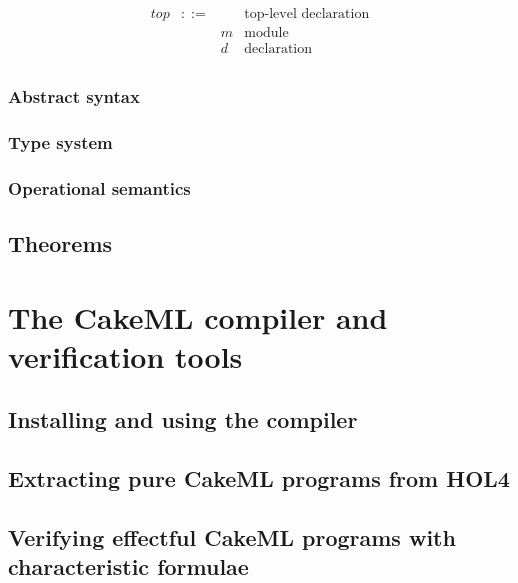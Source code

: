 \documentclass[12pt,a4paper]{book}
\begin{document}
\[
\begin{array}{lcll}
\mathit{top} &::=& &\mbox{top-level declaration}\\
&& m &\mbox{module}\\
&& d &\mbox{declaration}\\
\end{array}
\]



\section{Abstract syntax}
%
%
%
%
%
%
%
%
%
%
%
%
%
%
%
%
%
%
%
%
%
%
%
%
%
%
%
%
%
%
%
%
%
%
%
%
%
%
%
%

\section{Type system}

\section{Operational semantics}

\chapter{Theorems}


\part{The CakeML compiler and verification tools}

\chapter{Installing and using the compiler}

\chapter{Extracting pure CakeML programs from HOL4}

\chapter{Verifying effectful CakeML programs with characteristic formulae}
\end{document}
